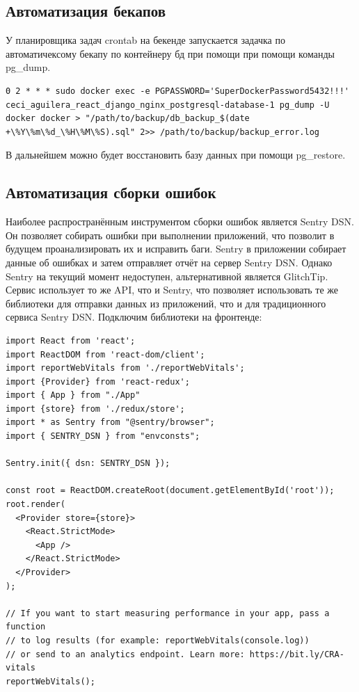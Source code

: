 \documentclass[a4paper,14pt]{extarticle}
\begin{document}
\subsection{Автоматизация бекапов}
У планировщика задач crontab на бекенде запускается задачка по автоматичексому бекапу
по контейнеру бд при помощи при помощи команды pg\_dump. 

\begin{verbatim}
0 2 * * * sudo docker exec -e PGPASSWORD='SuperDockerPassword5432!!!' ceci_aguilera_react_django_nginx_postgresql-database-1 pg_dump -U docker docker > "/path/to/backup/db_backup_$(date +\%Y\%m\%d_\%H\%M\%S).sql" 2>> /path/to/backup/backup_error.log
\end{verbatim}

В дальнейшем можно будет восстановить
базу данных при помощи pg\_restore.

\subsection{Автоматизация сборки ошибок}
Наиболее распространённым инструментом сборки ошибок является Sentry DSN. 
Он позволяет собирать ошибки при выполнении приложений, что позволит в будущем 
проанализировать их и исправить баги. Sentry в приложении собирает данные об ошибках и затем
отправляет отчёт на сервер Sentry DSN. Однако Sentry на текущий момент недоступен, 
альтернативной является GlitchTip. Сервис использует то же API, что и 
Sentry, что позволяет использовать те же библиотеки для отправки данных
из приложений, что и для традиционного сервиса Sentry DSN. Подключим библиотеки
на фронтенде:
\begin{verbatim}
import React from 'react';
import ReactDOM from 'react-dom/client';
import reportWebVitals from './reportWebVitals';
import {Provider} from 'react-redux';
import { App } from "./App"
import {store} from './redux/store';
import * as Sentry from "@sentry/browser";
import { SENTRY_DSN } from "envconsts";

Sentry.init({ dsn: SENTRY_DSN });

const root = ReactDOM.createRoot(document.getElementById('root'));
root.render(
  <Provider store={store}>
    <React.StrictMode>
      <App />
    </React.StrictMode>
  </Provider>
);

// If you want to start measuring performance in your app, pass a function
// to log results (for example: reportWebVitals(console.log))
// or send to an analytics endpoint. Learn more: https://bit.ly/CRA-vitals
reportWebVitals();
\end{verbatim}
\end{document}
